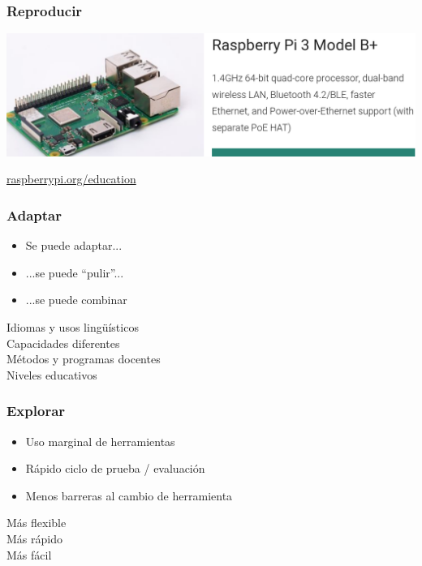 \documentclass[17pt,aspectratio=169]{beamer}
\begin{document}

\begin{frame}
\frametitle{Reproducir}

\includegraphics[width=\linewidth]{figs/raspberry-pi}

\begin{flushright}
\href{https://raspberrypi.org/education}{raspberrypi.org/education}
\end{flushright}

\end{frame}


\begin{frame}
\frametitle{Adaptar}

\begin{itemize}
\item Se puede adaptar...
\item ...se puede ``pulir''...
\item ...se puede combinar
\end{itemize}

\begin{flushright}
  Idiomas y usos lingüísticos \\
  Capacidades diferentes \\
  Métodos y programas docentes \\
  Niveles educativos \\
\end{flushright}
\end{frame}


\begin{frame}
\frametitle{Explorar}

\begin{itemize}
\item Uso marginal de herramientas
\item Rápido ciclo de prueba / evaluación
\item Menos barreras al cambio de herramienta
\end{itemize}

\begin{flushright}
  Más flexible \\
  Más rápido \\
  Más fácil
\end{flushright}
\end{frame}
\end{document}
